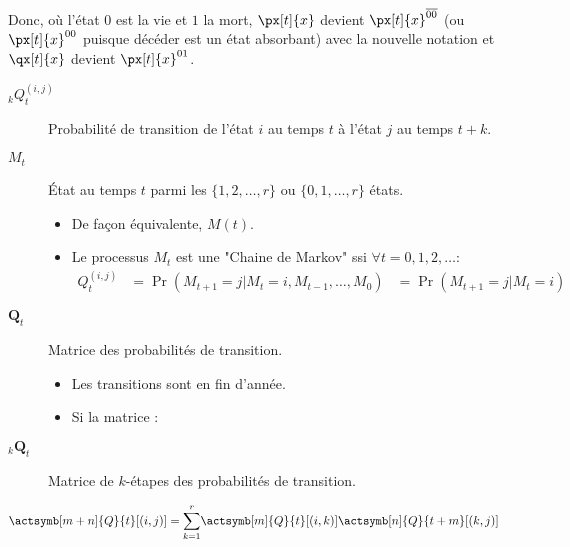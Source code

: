 \documentclass[10pt, french]{article}
\begin{document}
\begin{multicols*}{2}
Donc, où l'état $0$ est la vie et $1$ la mort, $\px[t]{x}$ devient $\px[t]{x}^{\overline{00}}$ (ou $\px[t]{x}^{00}$ puisque décéder est un état absorbant) avec la nouvelle notation et $\qx[t]{x}$ devient $\px[t]{x}^{01}$.

\begin{description}
	\item[$_{k}Q_{t}^{(i, j)}$]	Probabilité de transition de l'état $i$ au temps $t$ à l'état $j$ au temps $t + k$.
	\item[$M_{t}$]	État au temps $t$ parmi les $\{1, 2, \dots, r\}$ ou $\{0, 1, \dots, r\}$ états.
		\begin{itemize}[leftmargin = *]
		\item	De façon équivalente, $M(t)$.
		\item	Le processus $M_{t}$ est une "Chaine de Markov" ssi $\forall t = 0, 1, 2, \dots$:
		\begin{align*}
		Q_{t}^{(i, j)}
		&=	\Pr(M_{t + 1} = j | M_{t} = i, M_{t - 1}, \dots, M_{0})
		&=	\Pr(M_{t + 1} = j | M_{t} = i)
		\end{align*}
		\end{itemize}
	\item[$\bm{Q}_{t}$]	Matrice des probabilités de transition.
		\begin{itemize}[leftmargin = *]
		\item	Les transitions sont en fin d'année.
		\item	Si la matrice :
		\end{itemize}
	\item[$_{k}\bm{Q}_{t}$]	Matrice de $k$-étapes des probabilités de transition.
\end{description}

\begin{align*}
	\actsymb[m + n]{Q}{t}[(i, j)]
	&=	\sumz{r}{k = 1}\actsymb[m]{Q}{t}[(i, k)] \actsymb[n]{Q}{t + m}[(k, j)]
\end{align*}

\end{multicols*}
\end{document}
